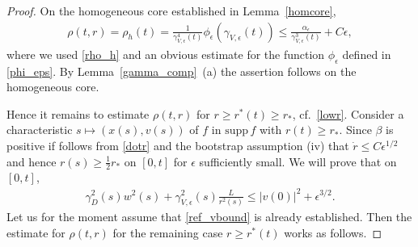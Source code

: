 \documentclass[11pt]{article}
\def\supp{\mathrm{supp}\,}
\begin{document}
\begin{proof}
  On the homogeneous core established in Lemma~\ref{homcore},
  \begin{align}\label{rho_h_est}
  \rho(t,r) =
  \rho_h(t) = \frac{1}{\gamma^4_{V,\epsilon}(t)}\phi_\epsilon(\gamma_{V,\epsilon}(t))
  \leq
  \frac{\alpha_\epsilon}{\gamma^3_{V,\epsilon}(t)} + C \epsilon,
  \end{align}
  where we used \eqref{rho_h} and an obvious estimate for the function
  $\phi_\epsilon$ defined in \eqref{phi_eps}.
  By Lemma~\ref{gamma_comp}~(a) the assertion follows on the homogeneous core.
  
  Hence it remains to estimate $\rho(t,r)$ for $r\geq r^\ast(t) \geq r_\ast$,
  cf.~\eqref{lowr}. Consider a characteristic $s\mapsto (x(s),v(s))$ of $f$
  in $\supp f$ with $r(t)\geq r_\ast$. Since $\beta$ is positive if follows
  from \eqref{dotr} and the bootstrap assumption (iv) that
  $\dot r \leq C \epsilon^{1/2}$ and hence $r(s)\geq \frac{1}{2}r_\ast$ on
  $[0,t]$ for $\epsilon$ sufficiently small. We will prove that on  $[0,t]$,
  \begin{align}\label{ref_vbound}
    \gamma_D^2(s) w^2(s) + \gamma^2_{V,\epsilon}(s) \frac{L}{r^2(s)}
    \leq |v(0)|^2 + \epsilon^{3/2}.
  \end{align}
  Let us for the moment assume that \eqref{ref_vbound} is already established.
  Then the estimate for $\rho(t,r)$ for the remaining case $r\geq r^\ast(t)$
  works as follows.
  

\end{proof}
\end{document}
